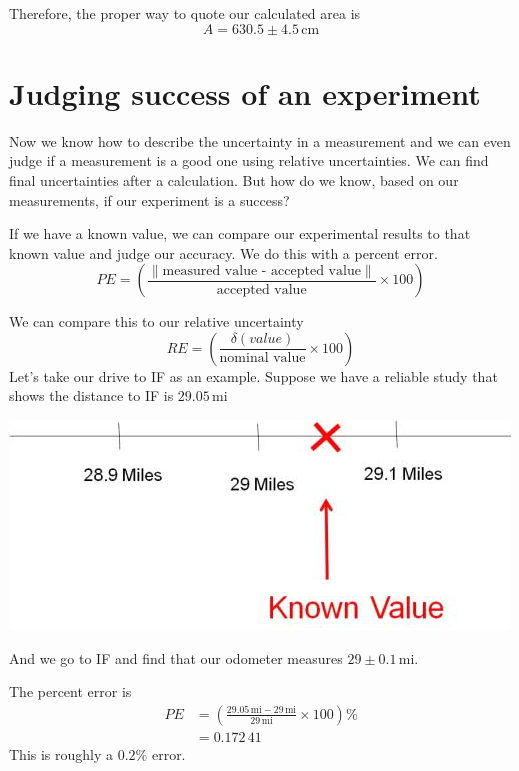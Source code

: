 \documentclass[twoside,11pt,ShortChapTitles]{BYUTextbook}
\begin{document}
Therefore, the proper way to quote our calculated area is
\[ A = 630.5 \pm 4.5\,\text{cm}\]
 
\section{Judging success of an experiment}

Now we know how to describe the uncertainty in a measurement and we can even
judge if a measurement is a good one using relative uncertainties. We can find
final uncertainties after a calculation. But how do we know, based on our
measurements, if our experiment is a success?

If we have a known value, we can compare our experimental results to that
known value and judge our accuracy. We do this with a percent error.
\[
PE=\left(  \frac{\left\|\text{measured value - accepted value}\right\|}{\text{accepted
value}}\times100\right)  \]




We can compare this to our relative uncertainty\[
RE=\left(  \frac{\delta(value)}{\text{nominal value}}\times100\right)  \]
Let's take our drive to IF as an example. Suppose we have a reliable study
that shows the distance to IF is $29.05\,\text{mi} $

\begin{center}
\includegraphics[width=\textwidth]{Lab1_Figs/old_images-008.png}\end{center}
 \bigskip And we go to IF and find that our odometer measures $29\pm0.1\,\text{mi} .$

The percent error is
\begin{align*}
PE  & =\left(  \frac{29.05\,\text{mi} -29\,\text{mi} }{29\,\text{mi} }\times100\right)  \%\\
& =0.172\,41\
\end{align*}
This is roughly a $0.2\%$ error.
\end{document}
